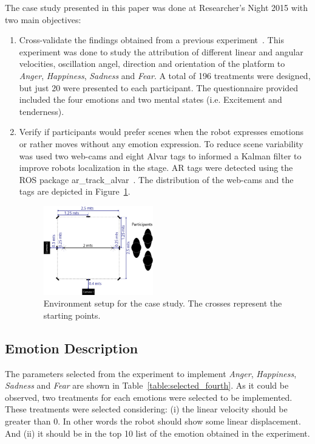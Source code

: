 The case study presented in this paper was done at Researcher's Night 2015 with two main objectives:
\begin{enumerate}
	\item Cross-validate the findings obtained from a previous experiment~\cite{Angel2017-2}. This experiment was done to study the attribution of different linear and angular velocities, oscillation angel, direction and orientation of the platform to \textit{Anger}, \textit{Happiness}, \textit{Sadness} and \textit{Fear}. A total of 196 treatments were designed, but just 20 were presented to each participant. The questionnaire provided included the four emotions and two mental states (i.e. Excitement and tenderness).
	\item Verify if participants would prefer scenes when the robot expresses emotions or rather moves without any emotion expression. To reduce scene variability was used two web-cams and eight Alvar tags to informed a Kalman filter to improve robots localization in the stage. AR tags were detected using the ROS package ar\_track\_alvar~\cite{artag2015}. The distribution of the web-cams and the tags are depicted in Figure~\ref{fig:setup_fourth}. 

\begin{figure}
	\centering
	\includegraphics[width=0.45\textwidth]{./Images/FourthCase.png} 
	\caption{Environment setup for the case study. The crosses represent the starting points.}
	\label{fig:setup_fourth}
\end{figure}
 
\end{enumerate}

\subsection{Emotion Description}

The parameters selected from the experiment to implement \textit{Anger}, \textit{Happiness}, \textit{Sadness} and \textit{Fear} are shown in Table~\ref{table:selected_fourth}. As it could be observed, two treatments for each emotions were selected to be implemented. These treatments were selected considering: (i) the linear velocity should be greater than $0$. In other words the robot should show some linear displacement. And (ii) it should be in the top 10 list of the emotion obtained in the experiment.

